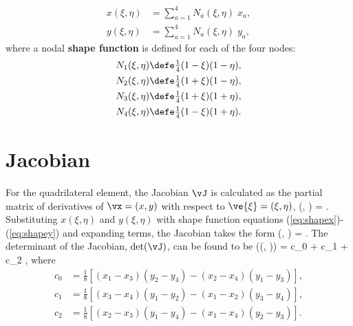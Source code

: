 \documentclass[11pt, oneside]{article}   	%
\begin{document}
\begin{align}
  x(\xi,\eta) & = \sum_{a=1}^4 N_a(\xi, \eta) \; x_a, \label{eq:shapex} \\
  y(\xi,\eta) & = \sum_{a=1}^4 N_a(\xi, \eta) \; y_a, \label{eq:shapey}
\end{align}
where a nodal {\bf shape function} is defined for each of the four nodes:
\begin{align}
  N_1(\xi, \eta) & \defe \tfrac{1}{4} (1 - \xi) (1 - \eta), \\
  N_2(\xi, \eta) & \defe \tfrac{1}{4} (1 + \xi) (1 - \eta), \\
  N_3(\xi, \eta) & \defe \tfrac{1}{4} (1 + \xi) (1 + \eta), \\
  N_4(\xi, \eta) & \defe \tfrac{1}{4} (1 - \xi) (1 + \eta).
\end{align}

\section{Jacobian}

For the quadrilateral element, the Jacobian $\vJ$ is calculated as 
the partial matrix of derivatives of $\vx = (x, y)$ with 
respect to $\ve{\xi} = (\xi, \eta)$, 
\be 
 \vJ(\xi, \eta)  
 \left[
  \frac{\partial \vx}{\partial \ve{\xi}}
 \right]
 = 
 .
\ee 
Substituting $x(\xi, \eta)$ and $y(\xi, \eta)$ with shape function equations
(\ref{eq:shapex})-(\ref{eq:shapey}) and expanding terms,  the Jacobian takes 
the form 
\be 
 \vJ(\xi, \eta) =  
  \left[ 
  \begin{tabular}{cc}
    $x_1$ & $y_1$ \\
    $x_2$ & $y_2$ \\
    $x_3$ & $y_3$ \\
    $x_4$ & $y_4$ \\
  \end{tabular}
  \right].
\ee 
The determinant of the Jacobian, $\det(\vJ)$, can be found to be 
\be 
\det(\vJ\left(\xi, \eta)\right) = c_0 + c_1 \xi + c_2 \eta,
\ee 
where
\begin{align}
  c_0 & = \frac{1}{8} \left[(x_1 - x_3) (y_2 - y_4) - (x_2 - x_4) (y_1 - y_3) \right], \\
  c_1 & = \frac{1}{8} \left[(x_3 - x_4) (y_1 - y_2) - (x_1 - x_2) (y_3 - y_4) \right], \\
  c_2 & = \frac{1}{8} \left[(x_2 - x_3) (y_1 - y_4) - (x_1 - x_4) (y_2 - y_3) \right].
\end{align}
\end{document}
